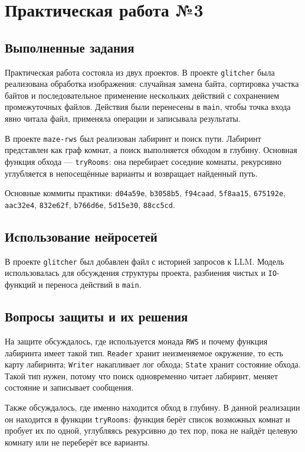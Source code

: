 \section{Практическая работа №3}
\label{sec:pr3}

\subsection{Выполненные задания}

Практическая работа состояла из двух проектов. В проекте \texttt{glitcher} была реализована обработка изображения: случайная замена байта, сортировка участка байтов и последовательное применение нескольких действий с сохранением промежуточных файлов. Действия были перенесены в \texttt{main}, чтобы точка входа явно читала файл, применяла операции и записывала результаты.

В проекте \texttt{maze-rws} был реализован лабиринт и поиск пути. Лабиринт представлен как граф комнат, а поиск выполняется обходом в глубину. Основная функция обхода --- \texttt{tryRooms}: она перебирает соседние комнаты, рекурсивно углубляется в непосещённые варианты и возвращает найденный путь.

Основные коммиты практики: \texttt{d04a59e}, \texttt{b3058b5}, \texttt{f94caad}, \texttt{5f8aa15}, \texttt{675192e}, \texttt{aac32e4}, \texttt{832e62f}, \texttt{b766d6e}, \texttt{5d15e30}, \texttt{88cc5cd}.

\subsection{Использование нейросетей}

В проекте \texttt{glitcher} был добавлен файл с историей запросов к LLM. Модель использовалась для обсуждения структуры проекта, разбиения чистых и \texttt{IO}-функций и переноса действий в \texttt{main}.

\subsection{Вопросы защиты и их решения}

На защите обсуждалось, где используется монада \texttt{RWS} и почему функция лабиринта имеет такой тип. \texttt{Reader} хранит неизменяемое окружение, то есть карту лабиринта; \texttt{Writer} накапливает лог обхода; \texttt{State} хранит состояние обхода. Такой тип нужен, потому что поиск одновременно читает лабиринт, меняет состояние и записывает сообщения.

Также обсуждалось, где именно находится обход в глубину. В данной реализации он находится в функции \texttt{tryRooms}: функция берёт список возможных комнат и пробует их по одной, углубляясь рекурсивно до тех пор, пока не найдёт целевую комнату или не переберёт все варианты.

\newpage
